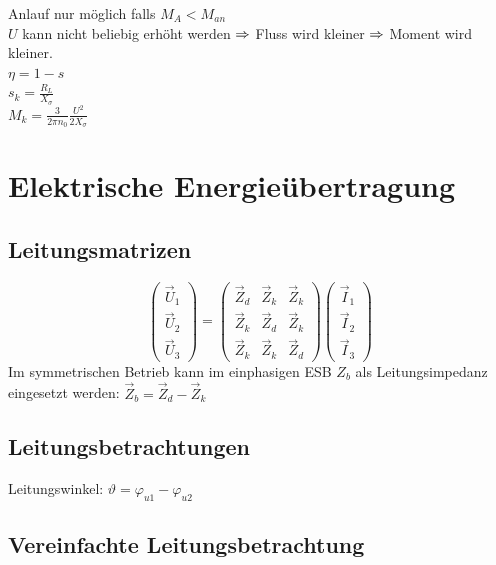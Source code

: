 \documentclass[fs, footer]{latex4ei}
\begin{document}
\begin{multicols}{4}
    Anlauf nur möglich falls $M_A < M_{an}$\\
    $U$ kann nicht beliebig erhöht werden $\Rightarrow$ Fluss wird kleiner $\Rightarrow$ Moment wird kleiner.\\

    $\eta = 1 - s$ \\
    $s_k = \frac{R_L}{X_\sigma}$ \\
    $M_k = \frac{3}{2 \pi n_0} \frac{U^2}{2 X_\sigma}$


    \section{Elektrische Energieübertragung}

    \subsection{Leitungsmatrizen}


    \[\begin{pmatrix} \vec U_1 \\ \vec U_2 \\ \vec U_3 \end{pmatrix} = \begin{pmatrix} \vec Z_d & \vec Z_k & \vec Z_k \\ \vec Z_k & \vec Z_d & \vec Z_k \\ \vec Z_k & \vec Z_k & \vec Z_d \end{pmatrix} \begin{pmatrix} \vec I_1 \\ \vec I_2 \\ \vec I_3 \end{pmatrix}\]
    Im symmetrischen Betrieb kann im einphasigen ESB $Z_b$ als Leitungsimpedanz eingesetzt werden: $\vec Z_b = \vec Z_d - \vec Z_k$

    \subsection{Leitungsbetrachtungen}

    Leitungswinkel: $\vartheta = \varphi_{u1} - \varphi_{u2}$


    \subsection{Vereinfachte Leitungsbetrachtung}



\end{multicols}
\end{document}
